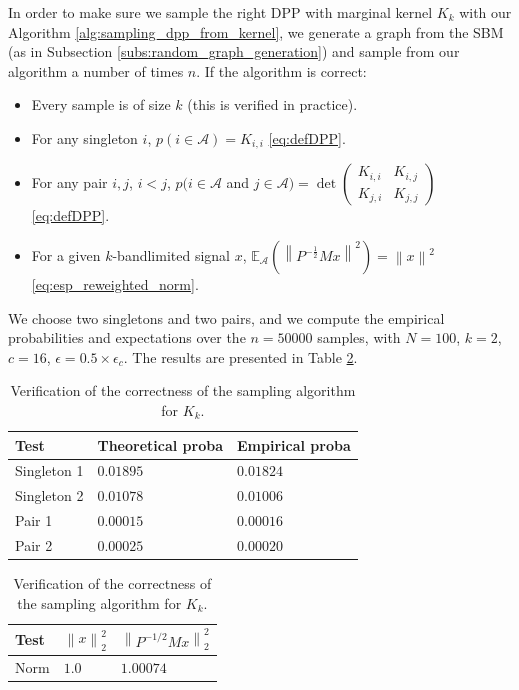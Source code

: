 \documentclass{article}
\newcommand{\norm}[1]{\left\|#1\right\|}
\begin{document}
In order to make sure we sample the right DPP with marginal kernel $K_k$ with our Algorithm \ref{alg:sampling_dpp_from_kernel}, we generate a graph from the SBM (as in Subsection \ref{subs:random_graph_generation}) and sample from our algorithm a number of times $n$. If the algorithm is correct:
\begin{itemize}
\item Every sample is of size $k$ (this is verified in practice).
\item For any singleton $i$, $p(i \in \mathcal{A}) = K_{i, i}$ \eqref{eq:defDPP}.
\item For any pair $i, j$, $i < j$, $p(i \in \mathcal{A} $ and $ j \in \mathcal{A}) = \det \begin{pmatrix} K_{i, i} & K_{i, j} \\ K_{j, i} & K_{j, j} \end{pmatrix}$ \eqref{eq:defDPP}.
\item For a given $k$-bandlimited signal $x$, $\mathbb{E}_\mathcal{A} \left( \norm{P^{-\frac{1}{2}} M x}^2 \right) = \norm{x}^2$ \eqref{eq:esp_reweighted_norm}.
\end{itemize}


We choose two singletons and two pairs, and we compute the empirical probabilities and expectations over the $n=50000$ samples, with $N=100$, $k=2$, $c=16$, $\epsilon = 0.5 \times \epsilon_c$. The results are presented in Table \ref{tab:Kk:verification}.


\begin{table}[th]
  \caption{Verification of the correctness of the sampling algorithm for $K_k$.}
  \label{tab:Kk:verification}
  \centering
  \begin{tabular}{lll}
    \toprule
    Test &  Theoretical proba & Empirical proba \\
    \midrule
    Singleton 1 & $0.01895$ & $0.01824$ \\
    Singleton 2 & $0.01078$ & $0.01006$ \\
    Pair 1 & $0.00015$ & $0.00016$ \\
		Pair 2 & $0.00025$ & $0.00020$ \\
    \bottomrule
  \end{tabular}
	\quad
	\begin{tabular}{lll}
    \toprule
    Test &  $\norm{x}_2^2$ & $\norm{P^{-1/2} M x}_2^2$ \\
    \midrule
    Norm & $1.0$ & $1.00074$ \\
    \bottomrule
  \end{tabular}
\end{table}
\end{document}
